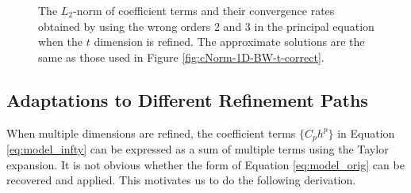 \begin{figure}[!htb]
\centering
{}
\hskip 20pt
\caption{The $L_2$-norm of coefficient terms and their convergence rates obtained by using the wrong orders 2 and 3 in the principal equation when the $t$ dimension is refined. The approximate solutions are the same as those used in Figure \ref{fig:cNorm-1D-BW-t-correct}.}
\label{fig:cNorm-1D-BW-t-wrong}
\end{figure}


\FloatBarrier
\subsection{Adaptations to Different Refinement Paths} \label{subsec:adapt_paths}
When multiple dimensions are refined, the coefficient terms $\{C_p h^p\}$ in Equation \ref{eq:model_infty} can be expressed as a sum of multiple terms using the Taylor expansion. It is not obvious whether the form of Equation \ref{eq:model_orig} can be recovered and applied. This motivates us to do the following derivation.

